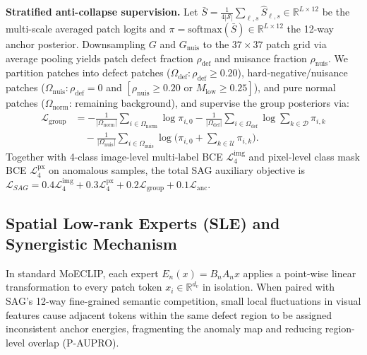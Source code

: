 \documentclass[conference]{IEEEtran}
\newcommand{\sag}{SAG}
\newcommand{\sle}{SLE}
\begin{document}
\textbf{Stratified anti-collapse supervision.} Let $\bar{S} = \frac{1}{4|\mathcal{S}|}\sum_{\ell,s} \hat{S}_{\ell,s} \in \mathbb{R}^{L \times 12}$ be the multi-scale averaged patch logits and $\pi = \mathrm{softmax}(\bar{S}) \in \mathbb{R}^{L \times 12}$ the 12-way anchor posterior. Downsampling $G$ and $G_{\mathrm{nuis}}$ to the $37{\times}37$ patch grid via average pooling yields patch defect fraction $\rho_{\mathrm{def}}$ and nuisance fraction $\rho_{\mathrm{nuis}}$. We partition patches into defect patches ($\Omega_{\mathrm{def}}: \rho_{\mathrm{def}} \ge 0.20$), hard-negative/nuisance patches ($\Omega_{\mathrm{nuis}}: \rho_{\mathrm{def}} = 0$ and $[\rho_{\mathrm{nuis}} \ge 0.20 \text{ or } M_{\mathrm{low}} \ge 0.25]$), and pure normal patches ($\Omega_{\mathrm{norm}}$: remaining background), and supervise the group posteriors via:
\begin{align}
\mathcal{L}_{\mathrm{group}} &= -\frac{1}{|\Omega_{\mathrm{norm}}|}\!\sum_{i \in \Omega_{\mathrm{norm}}}\!\! \log \pi_{i,0} - \frac{1}{|\Omega_{\mathrm{def}}|}\!\sum_{i \in \Omega_{\mathrm{def}}}\!\! \log \!\sum_{k \in \mathcal{D}}\! \pi_{i,k} \nonumber \\
&\quad - \frac{1}{|\Omega_{\mathrm{nuis}}|}\sum_{i \in \Omega_{\mathrm{nuis}}} \log\Big(\pi_{i,0} + \sum_{k \in \mathcal{U}} \pi_{i,k}\Big).
\end{align}
Together with 4-class image-level multi-label BCE $\mathcal{L}^{\mathrm{img}}_{4}$ and pixel-level class mask BCE $\mathcal{L}^{\mathrm{px}}_{4}$ on anomalous samples, the total \sag{} auxiliary objective is $\mathcal{L}_{\sag} = 0.4\mathcal{L}^{\mathrm{img}}_{4} + 0.3\mathcal{L}^{\mathrm{px}}_{4} + 0.2\mathcal{L}_{\mathrm{group}} + 0.1\mathcal{L}_{\mathrm{anc}}$.

\subsection{Spatial Low-rank Experts (\sle{}) and Synergistic Mechanism}


In standard MoECLIP, each expert $E_n(x) = B_n A_n x$ applies a point-wise linear transformation to every patch token $x_i \in \mathbb{R}^{d_v}$ in isolation. When paired with \sag{}'s 12-way fine-grained semantic competition, small local fluctuations in visual features cause adjacent tokens within the same defect region to be assigned inconsistent anchor energies, fragmenting the anomaly map and reducing region-level overlap (P-AUPRO).
\end{document}
